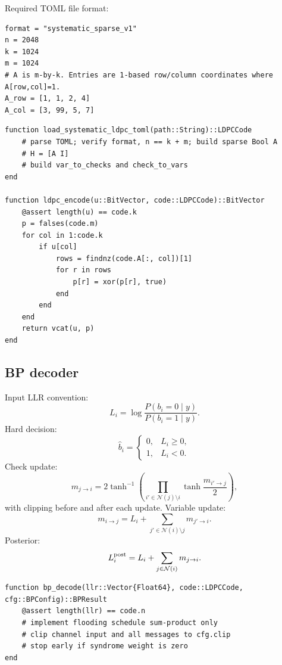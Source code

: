 \documentclass[11pt]{article}
\begin{document}
Required TOML file format:
\begin{lstlisting}[language={}]
format = "systematic_sparse_v1"
n = 2048
k = 1024
m = 1024
# A is m-by-k. Entries are 1-based row/column coordinates where A[row,col]=1.
A_row = [1, 1, 2, 4]
A_col = [3, 99, 5, 7]
\end{lstlisting}

\begin{lstlisting}
function load_systematic_ldpc_toml(path::String)::LDPCCode
    # parse TOML; verify format, n == k + m; build sparse Bool A
    # H = [A I]
    # build var_to_checks and check_to_vars
end

function ldpc_encode(u::BitVector, code::LDPCCode)::BitVector
    @assert length(u) == code.k
    p = falses(code.m)
    for col in 1:code.k
        if u[col]
            rows = findnz(code.A[:, col])[1]
            for r in rows
                p[r] = xor(p[r], true)
            end
        end
    end
    return vcat(u, p)
end
\end{lstlisting}

\subsection{BP decoder}

Input LLR convention:
\begin{equation}
L_i=\log\frac{P(b_i=0\mid y)}{P(b_i=1\mid y)}.
\end{equation}
Hard decision:
\begin{equation}
\hat b_i=\begin{cases}0,& L_i\ge0,\\1,&L_i<0.\end{cases}
\end{equation}
Check update:
\begin{equation}
m_{j\to i}=2\tanh^{-1}\left(\prod_{i'\in\mathcal N(j)\setminus i}\tanh\frac{m_{i'\to j}}{2}\right),
\end{equation}
with clipping before and after each update. Variable update:
\begin{equation}
m_{i\to j}=L_i+\sum_{j'\in\mathcal N(i)\setminus j}m_{j'\to i}.
\end{equation}
Posterior:
\begin{equation}
L_i^{\rm post}=L_i+\sum_{j\in\mathcal N(i)}m_{j\to i}.
\end{equation}

\begin{lstlisting}
function bp_decode(llr::Vector{Float64}, code::LDPCCode, cfg::BPConfig)::BPResult
    @assert length(llr) == code.n
    # implement flooding schedule sum-product only
    # clip channel input and all messages to cfg.clip
    # stop early if syndrome weight is zero
end
\end{lstlisting}
\end{document}
